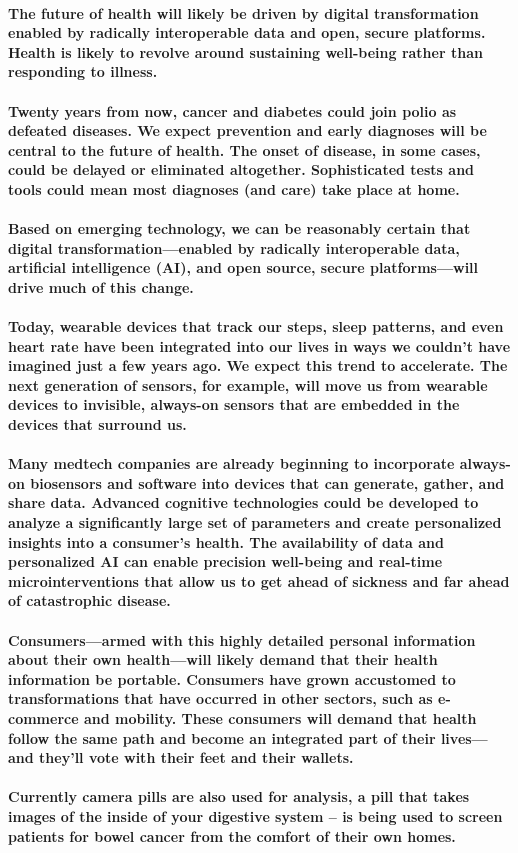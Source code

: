 \documentclass[12pt]{article}
\begin{document}
    \paragraph{The future of health will likely be driven by digital transformation enabled by radically interoperable data and open, secure platforms. Health is likely to revolve around sustaining well-being rather than responding to illness.\\\\
    Twenty years from now, cancer and diabetes could join polio as defeated diseases. We expect prevention and early diagnoses will be central to the future of health. The onset of disease, in some cases, could be delayed or eliminated altogether. Sophisticated tests and tools could mean most diagnoses (and care) take place at home.\\\\
    Based on emerging technology, we can be reasonably certain that digital transformation—enabled by radically interoperable data, artificial intelligence (AI), and open source, secure platforms—will drive much of this change.\\\\
    Today, wearable devices that track our steps, sleep patterns, and even heart rate have been integrated into our lives in ways we couldn’t have imagined just a few years ago. We expect this trend to accelerate. The next generation of sensors, for example, will move us from wearable devices to invisible, always-on sensors that are embedded in the devices that surround us.\\\\
    Many medtech companies are already beginning to incorporate always-on biosensors and software into devices that can generate, gather, and share data. Advanced cognitive technologies could be developed to analyze a significantly large set of parameters and create personalized insights into a consumer’s health. The availability of data and personalized AI can enable precision well-being and real-time microinterventions that allow us to get ahead of sickness and far ahead of catastrophic disease.\\\\
    Consumers—armed with this highly detailed personal information about their own health—will likely demand that their health information be portable. Consumers have grown accustomed to transformations that have occurred in other sectors, such as e-commerce and mobility. These consumers will demand that health follow the same path and become an integrated part of their lives—and they’ll vote with their feet and their wallets.\\\\
    Currently camera pills are also used for analysis, a pill that takes images of the inside of your digestive system – is being used to screen patients for bowel cancer from the comfort of their own homes. }
\end{document}
